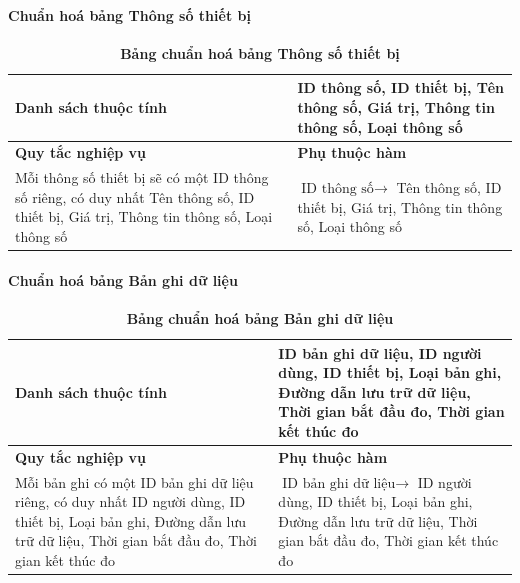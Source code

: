 \paragraph{Chuẩn hoá bảng Thông số thiết bị}
\mbox{}
\begin{table}[H]
  \caption{\bfseries \fontsize{12pt}{0pt}\selectfont Bảng chuẩn hoá bảng Thông số thiết bị}
  \centering
  \begin{tabularx}{0.9\textwidth}{|X|X|}
    \hline
    \textbf{Danh sách thuộc tính} & ID thông số, ID thiết bị, Tên thông số, Giá trị, 
    Thông tin thông số, Loại thông số \\
    \hline
    \textbf{Quy tắc nghiệp vụ} & \textbf{Phụ thuộc hàm} \\
    \hline
    Mỗi thông số thiết bị sẽ có một ID thông số riêng, có duy nhất Tên thông số, ID thiết bị, Giá trị,
    Thông tin thông số, Loại thông số
    & \parbox[t]{\linewidth}{$\text{ID thông số} \rightarrow$ Tên thông số, ID thiết bị, Giá trị,
    Thông tin thông số, Loại thông số} \\
    \hline
     \\
     \\
    \hline
  \end{tabularx}
\end{table}

\paragraph{Chuẩn hoá bảng Bản ghi dữ liệu}
\mbox{}
\begin{table}[H]
  \caption{\bfseries \fontsize{12pt}{0pt}\selectfont Bảng chuẩn hoá bảng Bản ghi dữ liệu}
  \centering
  \begin{tabularx}{0.9\textwidth}{|X|X|}
    \hline
    \textbf{Danh sách thuộc tính} & ID bản ghi dữ liệu, ID người dùng, ID thiết bị, Loại bản ghi, 
    Đường dẫn lưu trữ dữ liệu, Thời gian bắt đầu đo, Thời gian kết thúc đo \\
    \hline
    \textbf{Quy tắc nghiệp vụ} & \textbf{Phụ thuộc hàm} \\
    \hline
    Mỗi bản ghi có một ID bản ghi dữ liệu riêng, có duy nhất ID người dùng, ID thiết bị, Loại bản ghi, 
    Đường dẫn lưu trữ dữ liệu, Thời gian bắt đầu đo, Thời gian kết thúc đo
    & \parbox[t]{\linewidth}{$\text{ID bản ghi dữ liệu} \rightarrow$ ID người dùng, ID thiết bị, Loại bản ghi, 
    Đường dẫn lưu trữ dữ liệu, Thời gian bắt đầu đo, Thời gian kết thúc đo} \\
    \hline
     \\
     \\
    \hline
  \end{tabularx}
\end{table}

